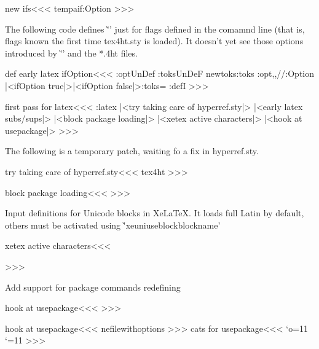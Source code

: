 \<new ifs\><<<
\:tempa{if:Option}
>>>



The following code defines \`'\ifOption' just for flags defined in the
comamnd line (that is, flags known the first time tex4ht.sty is
loaded).  It doesn't yet see those options introduced by \`'\Preamble'
and the *.4ht files.


\<def early latex ifOption\><<<
\ifx \config:opt\:UnDef \else
   \ifx\tmp:toks\:UnDeF    \csname newtoks\endcsname\tmp:toks\fi
   \def\:temp{\def\ifOption##1}
   \expandafter\expandafter\expandafter{}
        \expandafter{\config:opt,,//\if:Option
   |<ifOption true|>\else |<ifOption false|>\fi  \tmp:toks=}
   \pend:defI\ifOption{\def\:temp{##1}\:Optionfalse\:ScanOptions}
\fi
>>>



\<first pass for latex\><<<
\if:latex 
   |<try taking care of hyperref.sty|>
   |<early latex subs/sups|> 
\fi
|<block package loading|>
|<xetex active characters|>
|<hook at usepackage|>
>>>

The following is a temporary patch, waiting fo a fix in hyperref.sty.


\<try taking care of hyperref.sty\><<<
\expandafter\def\csname opt@hyperref.sty\endcsname{tex4ht}
>>>

\<block package loading\><<<
\def\:dontusepackage#1{%
  \typeout{tex4ht warning: package #1 was prevented from loading}
  \@namedef{ver@#1.sty}{9999/12/31}%
  \@namedef{opt@#1.sty}{\:currentoptions}
}
>>>

Input definitions for Unicode blocks in XeLaTeX. It loads full Latin by
default, others must be activated using \`'xeuniuseblock{blockname}'

\<xetex active characters\><<<
\ifx\XeTeXversion\@undefined\else
\ifx\xeuniuseblock\@undefined

\fi\fi
>>>

Add support for package commands redefining

\<hook at usepackage\><<<
\def\:AtEndOfPackage{\expandafter\g@addto@macro\csname pkg:end:hook:\@currname.sty\endcsname}
\def\init:package:hooks#1{\expandafter\def\csname pkg:end:hook:#1\endcsname{}}
\def\package:hooks#1{\csname pkg:end:hook:#1\endcsname}
>>>

\<hook at usepackage\><<<
\let\:onefilewithoptions\@onefilewithoptions
\def\@onefilewithoptions#1[#2][#3]#4{%
\init:package:hooks{#1.#4}%
   \let\:temp\@reset@ptions
   \def\@reset@ptions{%
      \let\@reset@ptions\:temp
      |<cats for usepackage|>\a:usepackage
      |<recall usepackage cats|>}%
      \def\:currentoptions{#2}
\:onefilewithoptions#1[#2][#3]{#4}\package:hooks{#1.#4}}
\def\a:usepackage{ }
>>>
\<cats for usepackage\><<<
\edef\TivhTcats{%
   \catcode`:=\the\catcode`:%
   \catcode`@=\the\catcode`@}%
\catcode`\:=11 \catcode`\@=11
>>>

